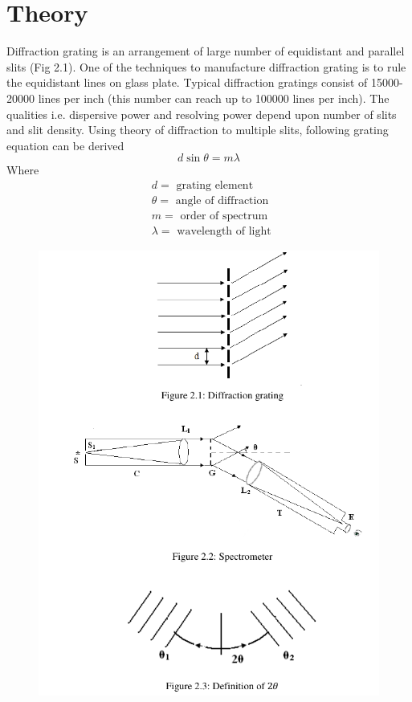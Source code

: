 \documentclass[11pt]{article}
\begin{document}
	
	\section{Theory}
 Diffraction grating is an arrangement of large number of equidistant and parallel slits
(Fig 2.1). One of the techniques to manufacture diffraction grating is to rule the equidistant lines
on glass plate. Typical diffraction gratings consist of 15000-20000 lines per inch (this number
can reach up to 100000 lines per inch). The qualities i.e. dispersive power and resolving power
depend upon number of slits and slit density.
Using theory of diffraction to multiple slits, following grating equation can be derived\\
\clearpage
	$$
	d \sin \theta=m \lambda
	$$
	Where
	$$
	\begin{aligned}
		&d=\text { grating element } \\
		&\theta=\text { angle of diffraction } \\
		&m=\text { order of spectrum } \\
		&\lambda=\text { wavelength of light }
	\end{aligned}
	$$
	\begin{figure}[H]
		\centering
		\includegraphics[scale=0.7]{theory.png}
		\label{it}
	\end{figure}
	
\end{document}
